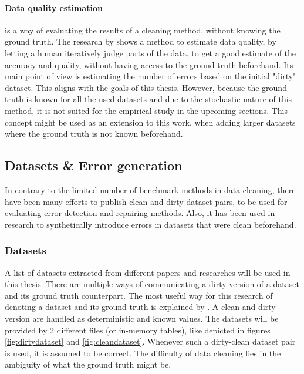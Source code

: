 \paragraph{Data quality estimation} is a way of evaluating the results of a cleaning method, without knowing the ground truth. The research by \cite{Chung2017-cl} shows a method to estimate data quality, by letting a human iteratively judge parts of the data, to get a good estimate of the accuracy and quality, without having access to the ground truth beforehand. Its main point of view is estimating the number of errors based on the initial "dirty" dataset. This aligns with the goals of this thesis. However, because the ground truth is known for all the used datasets and due to the stochastic nature of this method, it is not suited for the empirical study in the upcoming sections. This concept might be used as an extension to this work, when adding larger datasets where the ground truth is not known beforehand.


\subsection{Datasets \& Error generation}
In contrary to the limited number of benchmark methods in data cleaning, there have been many efforts to publish clean and dirty dataset pairs, to be used for evaluating error detection and repairing methods. Also, it has been used in research to synthetically introduce errors in datasets that were clean beforehand.

\subsubsection{Datasets}
A list of datasets extracted from different papers and researches will be used in this thesis. There are multiple ways of communicating a dirty version of a dataset and its ground truth counterpart. The most useful way for this research of denoting a dataset and its ground truth is explained by \cite{Mahdavi2019-zf}. A clean and dirty version are handled as deterministic and known values. The datasets will be provided by 2 different files (or in-memory tables), like depicted in figures \ref{fig:dirtydataset} and \ref{fig:cleandataset}. Whenever such a dirty-clean dataset pair is used, it is assumed to be correct. The difficulty of data cleaning lies in the ambiguity of what the ground truth might be. 

